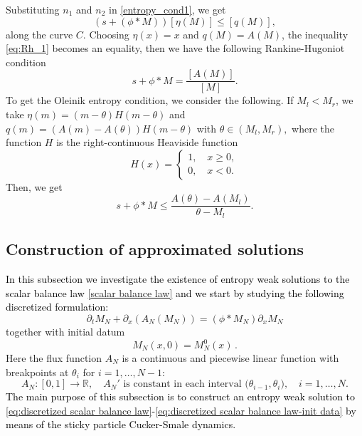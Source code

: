 \documentclass[11pt,a4paper,oneside]{amsart}
\newcommand\R{\mathbb{R}}
\begin{document}
Substituting $n_1$ and $n_2$ in \eqref{entropy_cond1}, we get
\begin{equation}\label{eq:Rh_1}
(s+(\phi\ast M))[\eta(M)]\leq[q(M)],
\end{equation}
along the curve $C$. Choosing $\eta(x)=x$ and $q(M)=A(M)$, the inequality \eqref{eq:Rh_1} becomes an equality, 
then we have the following Rankine-Hugoniot condition
\begin{equation}\label{eq:RH_M}
s+\phi\ast M=\frac{[A(M)]}{[M]}.
\end{equation}
To get the Oleinik entropy condition, we consider the following.
If $M_l<M_r$, we take $\eta(m)=(m-\theta)H(m-\theta)$ and $q(m)=(A(m)-A(\theta))H(m-\theta)$ with $\theta\in(M_l,M_r),$ 
where the function $H$ is the right-continuous Heaviside function
\begin{equation*}
    H(x)=
    \begin{cases}
        1,\quad x\geq 0,\\
        0,\quad x<0.
    \end{cases}
\end{equation*}
Then, we get
\begin{equation}\label{eq:oleinik}
s+\phi\ast M\leq\frac{A(\theta)-A(M_l)}{\theta-M_l}.
\end{equation}

\subsection{\color{black}Construction of approximated solutions%
\label{sec:scalar_balance_law}
}
\textcolor{black}{In this subsection we investigate the existence of entropy weak solutions to the scalar balance law \eqref{scalar balance law} and 
we start by studying the following discretized formulation:}
\begin{equation}\label{eq:discretized scalar balance law}
    \partial_t M_N+\partial_x(A_N(M_N))=(\phi\ast M_N)\partial_x M_N 
\end{equation} 
together with initial datum
\begin{equation}\label{eq:discretized scalar balance law-init data}
   M_N(x,0)=M_N^0(x)\,.
\end{equation}
Here the flux function $A_N$ is a continuous and piecewise linear function with breakpoints at $\theta_i$ for $i=1,\dots,N-1$:
\begin{equation}\label{def: A_N}
    A_N:[0,1]\rightarrow \R, \quad \mbox{$A_N'$ is constant in each interval $(\theta_{i-1},\theta_i$)}, \quad
    i=1,\dots,N.
\end{equation}
\textcolor{black}{The main purpose of this subsection is to construct %
an entropy weak solution to 
\eqref{eq:discretized scalar balance law}-\eqref{eq:discretized scalar balance law-init data} 
by means of %
the sticky particle Cucker-Smale dynamics.}
\end{document}
